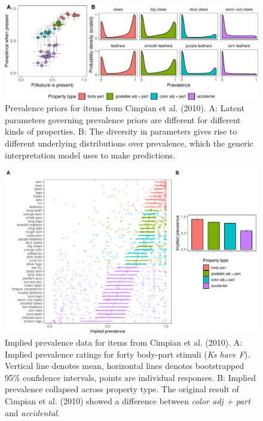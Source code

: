 \documentclass[floatsintext,doc]{apa6}
\begin{document}
\begin{figure}
\centering
\includegraphics{genint_files/figure-latex/cimpian-prevPrior-1.pdf}
\caption{\label{fig:cimpian-prevPrior}Prevalence priors for items from
Cimpian et al. (2010). A: Latent parameters governing prevalence priors
are different for different kinds of properties. B: The diversity in
parameters gives rise to different underlying distributions over
prevalence, which the generic interpretation model uses to make
predictions.}
\end{figure}


\begin{figure}
\centering
\includegraphics{figs/cimpian-results}
\caption{\label{fig:cimpian-modelingResults}Implied prevalence data for items from Cimpian et al. (2010). A: Implied prevalence ratings for forty body-part stimuli (\emph{Ks have F}). Vertical line denotes mean, horizontal lines denotes bootstrapped 95\% confidence intervals, points are individual responses. B: Implied prevalence collapsed across property type. The original result of Cimpian et al. (2010) showed a difference between \emph{color adj + part} and \emph{accidental}.}
\end{figure}

\end{document}
